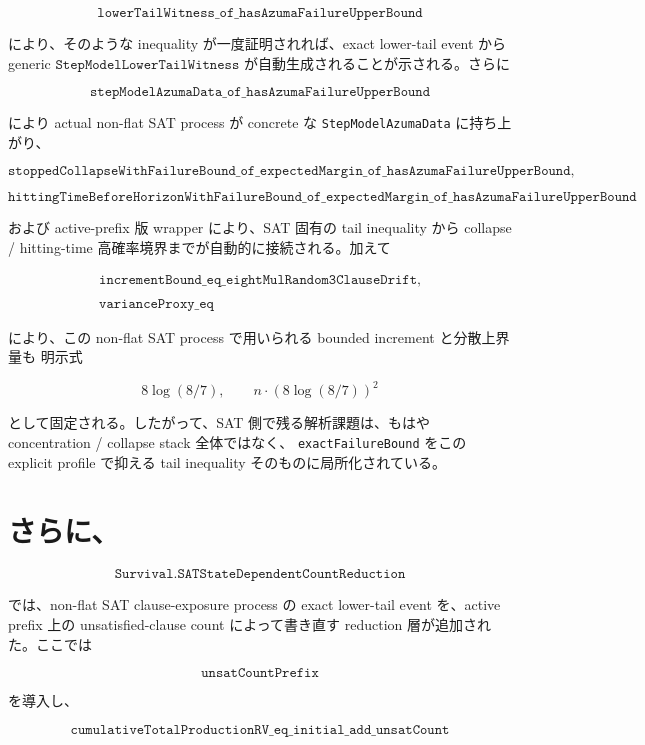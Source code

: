 \documentclass[12pt,a4paper]{article}
\begin{document}
\[
\texttt{lowerTailWitness\_of\_hasAzumaFailureUpperBound}
\]

により、そのような inequality が一度証明されれば、exact lower-tail event から generic \(\texttt{StepModelLowerTailWitness}\) が自動生成されることが示される。さらに

\[
\texttt{stepModelAzumaData\_of\_hasAzumaFailureUpperBound}
\]

により actual non-flat SAT process が concrete な \texttt{StepModelAzumaData} に持ち上がり、

\[
\texttt{stoppedCollapseWithFailureBound\_of\_expectedMargin\_of\_hasAzumaFailureUpperBound},
\]

\[
\texttt{hittingTimeBeforeHorizonWithFailureBound\_of\_expectedMargin\_of\_hasAzumaFailureUpperBound}
\]

および active-prefix 版 wrapper により、SAT 固有の tail inequality から collapse / hitting-time 高確率境界までが自動的に接続される。加えて

\[
\begin{aligned}
\texttt{incrementBound\_eq\_eightMulRandom3ClauseDrift}, \\
\qquad \\
\texttt{varianceProxy\_eq}
\end{aligned}
\]

により、この non-flat SAT process で用いられる bounded increment と分散上界量も 明示式

\[
8\log(8/7),\qquad n\cdot(8\log(8/7))^2
\]

として固定される。したがって、SAT 側で残る解析課題は、もはや concentration / collapse stack 全体ではなく、 \texttt{exactFailureBound} をこの explicit profile で抑える tail inequality そのものに局所化されている。

\section{さらに、}\label{ux3055ux3089ux306b-21}

\[
\texttt{Survival.SATStateDependentCountReduction}
\]

では、non-flat SAT clause-exposure process の exact lower-tail event を、active prefix 上の unsatisfied-clause count によって書き直す reduction 層が追加された。ここでは

\[
\texttt{unsatCountPrefix}
\]

を導入し、

\[
\texttt{cumulativeTotalProductionRV\_eq\_initial\_add\_unsatCount}
\]
\end{document}
